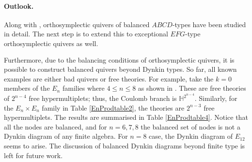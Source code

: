 \documentclass[a4paper,11pt]{article}
\begin{document}
% 
\paragraph{Outlook.}
Along with \cite{Bourget:2020xdz}, orthosymplectic quivers of balanced $ABCD$-types have been studied in detail. The next step is to extend this to exceptional $EFG$-type orthosymplectic quivers as well. 

Furthermore, due to the balancing conditions of orthosymplectic quivers, it is possible to construct balanced quivers beyond Dynkin types. So far, all known examples are either bad quivers or free theories. 
For example, take the $k=0$ members of the $E_n$ families where $4\leq n \leq 8$ as shown in \cite[Fig.\ 18]{Bourget:2020xdz}. These are free theories of $2^{n-4}$ free hypermultiplets; thus, the Coulomb branch is $\mathbb{H}^{2^{n-4}}$. Similarly, for the $E_n\times E_n$ family in Table \ref{EnProdtable2}, the theories are $2^{n-3}$ free hypermultiplets. The results are summarised in Table \ref{EnProdtable4}. Notice that all the nodes are balanced, and for $n=6,7,8$ the balanced set of nodes is not a Dynkin diagram of any finite algebra. For $n=8$ case, the Dynkin diagram of $E_{12}$ seems to arise. The discussion of balanced Dynkin diagrams beyond finite type is left for future work. 
\end{document}
